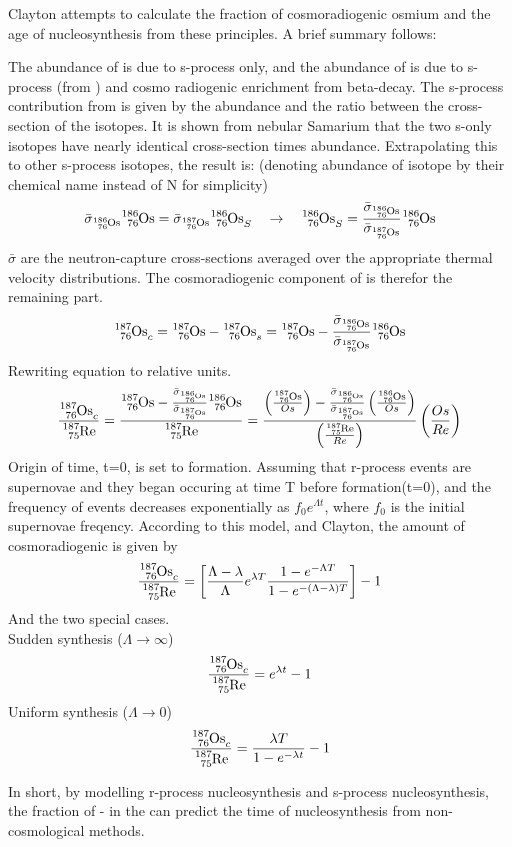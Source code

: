 Clayton attempts to calculate the fraction of cosmoradiogenic osmium and the age of nucleosynthesis from these principles.
A brief summary follows:

The abundance of  is due to s-process only, and the abundance of  is due to s-process (from ) and cosmo radiogenic enrichment from  beta-decay.
The s-process contribution from  is given by the  abundance and the ratio between the cross-section of the isotopes. It is shown from nebular Samarium that the two s-only isotopes have nearly identical cross-section times abundance. Extrapolating this to other s-process isotopes, the result is:
(denoting abundance of isotope by their chemical name instead of N for simplicity)
\begin{equation}
  \bar{\sigma}_{\os{186}}{\os{186}} = \bar{\sigma}_{\os{187}}{\os{186}_S}
  \quad \rightarrow \quad
  {\os{186}_S} = \frac{\bar{\sigma}_{\os{186}}}{\bar{\sigma}_{\os{187}}}{\os{186}}
\end{equation}
$\bar{\sigma}$ are the neutron-capture cross-sections averaged over the appropriate thermal velocity distributions.
The cosmoradiogenic component of  is therefor the remaining part.
\begin{equation}
  \os{187}_c = \os{187} - \os{187}_s = \os{187} - \frac{\bar{\sigma}_{\os{186}}}{\bar{\sigma}_{\os{187}}}{\os{186}}
\end{equation}
Rewriting equation to relative units.
\begin{equation}
  \frac{\os{187}_c}{\re{187}} = \frac{\os{187} - \frac{\bar{\sigma}_{\os{186}}}{\bar{\sigma}_{\os{187}}}{\os{186}}}{\re{187}} =
  \frac{
    \left(\frac{\os{187}}{Os}\right) -
    \frac{\bar{\sigma}_{\os{186}}}{\bar{\sigma}_{\os{187}}}
    \left(\frac{\os{186}}{Os}\right)
  }{
    \left(\frac{\re{187}}{Re}\right)
  }
  \left(\frac{Os}{Re}\right)
\end{equation}
Origin of time, t=0, is set to \sos formation. Assuming that r-process events are supernovae and they began occuring at time T before \sos formation(t=0), and the frequency of events decreases exponentially as $f_0e^{\Lambda t}$, where $f_0$ is the initial supernovae freqency.
According to this model, and Clayton, the amount of cosmoradiogenic  is given by
\begin{equation}
  \frac{\os{187}_c}{\re{187}} = \left[
    \frac{\Lambda-\lambda}{\Lambda}
    e^{\lambda T}
    \frac{1-e^{-\Lambda T}}{1-e^{-(\Lambda-\lambda) T}}
    \right] - 1
\end{equation}
And the two special cases. \\
Sudden synthesis ($\Lambda\rightarrow\infty$)
\begin{equation}
  \frac{\os{187}_c}{\re{187}} = e^{\lambda t} - 1
\end{equation}
Uniform synthesis ($\Lambda\rightarrow 0$)
\begin{equation}
  \frac{\os{187}_c}{\re{187}} = \frac{\lambda T}{1-e^{-\lambda t}} - 1
\end{equation}


In short, by modelling r-process nucleosynthesis and s-process nucleosynthesis, the fraction of - in the \sos can predict the time of nucleosynthesis from non-cosmological methods.
\fi
